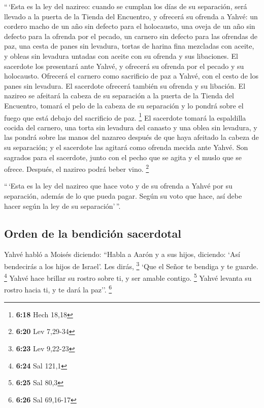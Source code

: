  ``\,`Esta es la ley del nazireo: cuando se cumplan los
días de su separación, será llevado a la puerta de la Tienda del
Encuentro,  y ofrecerá su ofrenda a Yahvé: un cordero
macho de un año sin defecto para el holocausto, una oveja de un año sin
defecto para la ofrenda por el pecado, un carnero sin defecto para las
ofrendas de paz,  una cesta de panes sin levadura, tortas
de harina fina mezcladas con aceite, y obleas sin levadura untadas con
aceite con su ofrenda y sus libaciones.  El sacerdote los
presentará ante Yahvé, y ofrecerá su ofrenda por el pecado y su
holocausto.  Ofrecerá el carnero como sacrificio de paz a
Yahvé, con el cesto de los panes sin levadura. El sacerdote ofrecerá
también su ofrenda y su libación.  El nazireo se afeitará
la cabeza de su separación a la puerta de la Tienda del Encuentro,
tomará el pelo de la cabeza de su separación y lo pondrá sobre el fuego
que está debajo del sacrificio de paz. \footnote{\textbf{6:18} Hech
  18,18}  El sacerdote tomará la espaldilla cocida del
carnero, una torta sin levadura del canasto y una oblea sin levadura, y
las pondrá sobre las manos del nazareo después de que haya afeitado la
cabeza de su separación;  y el sacerdote las agitará como
ofrenda mecida ante Yahvé. Son sagrados para el sacerdote, junto con el
pecho que se agita y el muslo que se ofrece. Después, el nazireo podrá
beber vino. \footnote{\textbf{6:20} Lev 7,29-34}

 ``\,`Esta es la ley del nazireo que hace voto y de su
ofrenda a Yahvé por su separación, además de lo que pueda pagar. Según
su voto que hace, así debe hacer según la ley de su separación'\,''.

\hypertarget{orden-de-la-bendiciuxf3n-sacerdotal}{%
\subsection{Orden de la bendición
sacerdotal}\label{orden-de-la-bendiciuxf3n-sacerdotal}}

 Yahvé habló a Moisés diciendo:  ``Habla a
Aarón y a sus hijos, diciendo: `Así bendecirás a los hijos de Israel'.
Les dirás, \footnote{\textbf{6:23} Lev 9,22-23}  `Que el
Señor te bendiga y te guarde. \footnote{\textbf{6:24} Sal 121,1}
 Yahvé hace brillar su rostro sobre ti, y ser amable
contigo. \footnote{\textbf{6:25} Sal 80,3}  Yahvé levanta
su rostro hacia ti, y te dará la paz''. \footnote{\textbf{6:26} Sal
  69,16-17}

